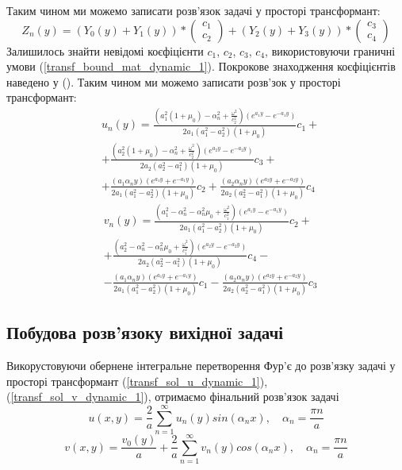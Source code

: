 Таким чином ми можемо записати розв'язок задачі у просторі трансформант:
\begin{equation}
    Z_n(y) =\left( Y_0(y) +  Y_1(y)  \right) * \begin{pmatrix} c_1 \\ c_2 \end{pmatrix} + \left( Y_2(y) +  Y_3(y) \right) * \begin{pmatrix} c_3 \\ c_4 \end{pmatrix}
\end{equation}
Залишилось знайти невідомі коєфіцієнти $c_1$, $c_2$, $c_3$, $c_4$, використовуючи граничні умови (\ref{transf_bound_mat_dynamic_1}).
Покрокове знаходження коєфіцієнтів наведено у ().
Таким чином ми можемо записати розв'зок у просторі трансформант:
\begin{align}\label{transf_sol_u_dynamic_1}
    &u_n(y) = \frac{( a_1^2 (1 + \mu_0) -\alpha_n^2 + \frac{\omega^2}{c_2^2})(e^{a_1y} - e^{-a_1y})}{2a_1(a_1^2 - a_2^2)(1 + \mu_0)}c_1 + \nonumber \\
    & + \frac{( a_2^2 (1 + \mu_0) -\alpha_n^2 + \frac{\omega^2}{c_2^2})(e^{a_2y} - e^{-a_2y})}{2a_2(a_2^2 - a_1^2)(1 + \mu_0)}c_3 + \nonumber \\
    & + \frac{(a_1 \alpha_n y)(e^{a_1y} + e^{-a_1y})}{2a_1(a_1^2 - a_2^2)(1 + \mu_0)}c_2 + \frac{(a_2 \alpha_n y)(e^{a_2y} + e^{-a_2y})}{2a_2(a_2^2 - a_1^2)(1 + \mu_0)}c_4
\end{align}
\begin{align}\label{transf_sol_v_dynamic_1}
    &v_n(y) = \frac{(a_1^2 - \alpha_n^2 - \alpha_n^2\mu_0 + \frac{\omega^2}{c_1^2})(e^{a_1y} - e^{-a_1y})}{2a_1(a_1^2 - a_2^2)(1 + \mu_0)}c_2 + \nonumber \\
    & +\frac{(a_2^2 - \alpha_n^2 - \alpha_n^2\mu_0 + \frac{\omega^2}{c_1^2})(e^{a_2y} - e^{-a_2y})}{2a_2(a_2^2 - a_1^2)(1 + \mu_0)}c_4 - \nonumber \\
    & - \frac{(a_1 \alpha_n y)(e^{a_1y} + e^{-a_1y})}{2a_1(a_1^2 - a_2^2)(1 + \mu_0)}c_1 - \frac{(a_2 \alpha_n y)(e^{a_2y} + e^{-a_2y})}{2a_2(a_2^2 - a_1^2)(1 + \mu_0)}c_3
\end{align}

\subsection{Побудова розв'язоку вихідної задачі}
Викорустовуючи обернене інтегральне перетворення Фур'є до розв'язку задачі у просторі трансформант
(\ref{transf_sol_u_dynamic_1}), (\ref{transf_sol_v_dynamic_1}), отримаємо фінальний розв'язок задачі
\begin{equation}
    u(x,y) = \frac{2}{a} \sum_{n=1}^{\infty} u_n(y) sin(\alpha_n x), \quad \alpha_n = \frac{\pi n}{a}
\end{equation}
\begin{equation}
    v(x,y) = \frac{v_0(y)}{a} + \frac{2}{a} \sum_{n=1}^{\infty} v_n(y) cos(\alpha_n x), \quad \alpha_n = \frac{\pi n}{a}
\end{equation}

